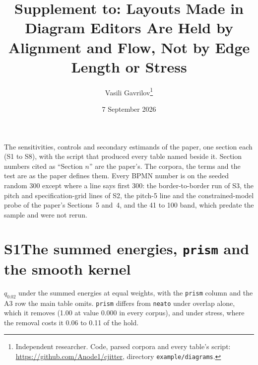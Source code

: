 \documentclass[11pt]{article}
\title{\textbf{Supplement to: Layouts Made in Diagram Editors Are Held by Alignment and Flow,
Not by Edge Length or Stress}}
\author{Vasili Gavrilov\thanks{Independent researcher. Code, parsed corpora and every
table's script: \url{https://github.com/Anode1/cjitter}, directory
\texttt{example/diagrams}.}}
\date{7 September 2026}
\begin{document}
\maketitle

\noindent The sensitivities, controls and secondary estimands of the paper, one section
each (S1 to S8), with the script that produced every table named beside it. Section numbers cited
as ``Section $n$'' are the paper's. The corpora, the terms and the test are as the paper
defines them. Every BPMN number is on the seeded random 300 except where a line says
first 300: the border-to-border run of S3, the pitch and specification-grid lines of S2,
the pitch-5 line and the constrained-model probe of the paper's Sections~5 and~4, and the
41 to 100 band, which predate the sample and were not rerun.


\section*{S1\quad The summed energies, \texttt{prism} and the smooth kernel}

$q_{0.02}$ under the summed energies at equal weights, with the \texttt{prism} column and
the A3 row the main table omits. \texttt{prism} differs from \texttt{neato} under overlap alone, which it
removes (1.00 at value 0.000 in every corpus), and under stress, where the removal costs
it 0.06 to 0.11 of the hold.
\end{document}
